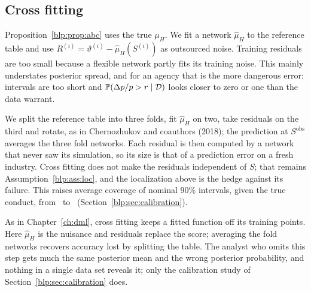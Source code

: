 \subsection{Cross fitting}
Proposition~\ref{blp:prop:abc} uses the true $\mu_H$. We fit a network $\hat\mu_H$ to the reference table and use $R^{(i)}=\vartheta^{(i)}-\hat\mu_H(S^{(i)})$ as outsourced noise. Training residuals are too small because a flexible network partly fits its training noise. This mainly understates posterior spread, and for an agency that is the more dangerous error: intervals are too short and $\mathbb{P}(\Delta p/p > r\mid\mathcal{D})$ looks closer to zero or one than the data warrant.

We split the reference table into three folds, fit $\hat\mu_H$ on two, take residuals on the third and rotate, as in Chernozhukov and coauthors (2018); the prediction at $S^{\mathrm{obs}}$ averages the three fold networks. Each residual is then computed by a network that never saw its simulation, so its size is that of a prediction error on a fresh industry. Cross fitting does not make the residuals independent of $S$; that remains Assumption~\ref{blp:ass:loc}, and the localization above is the hedge against its failure. This raises average coverage of nominal 90\% intervals, given the true conduct, from \numcovnaive\ to \numcovavg\ (Section~\ref{blp:sec:calibration}).

As in Chapter~\ref{ch:dml}, cross fitting keeps a fitted function off its training points. Here $\hat\mu_H$ is the nuisance and residuals replace the score; averaging the fold networks recovers accuracy lost by splitting the table. The analyst who omits this step gets much the same posterior mean and the wrong posterior probability, and nothing in a single data set reveals it; only the calibration study of Section~\ref{blp:sec:calibration} does.

